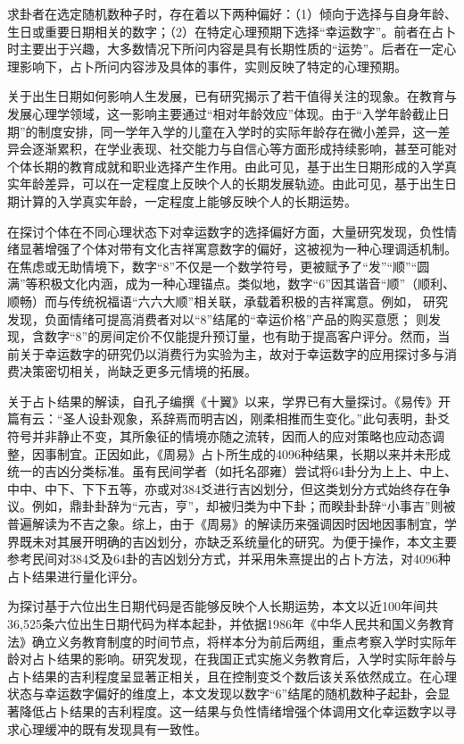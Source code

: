 \documentclass[11pt, a4paper, UTF8]{chinese-erj}
\begin{document}
求卦者在选定随机数种子时，存在着以下两种偏好：（1）倾向于选择与自身年龄、生日或重要日期相关的数字；（2）在特定心理预期下选择“幸运数字”。前者在占卜时主要出于兴趣，大多数情况下所问内容是具有长期性质的“运势”。后者在一定心理影响下，占卜所问内容涉及具体的事件，实则反映了特定的心理预期。

关于出生日期如何影响人生发展，已有研究揭示了若干值得关注的现象。在教育与发展心理学领域，这一影响主要通过“相对年龄效应”体现。由于“入学年龄截止日期”的制度安排，同一学年入学的儿童在入学时的实际年龄存在微小差异，这一差异会逐渐累积，在学业表现、社交能力与自信心等方面形成持续影响，甚至可能对个体长期的教育成就和职业选择产生作用\parencite{xu2021}。由此可见，基于出生日期形成的入学真实年龄差异，可以在一定程度上反映个人的长期发展轨迹。由此可见，基于出生日期计算的入学真实年龄，一定程度上能够反映个人的长期运势。

在探讨个体在不同心理状态下对幸运数字的选择偏好方面，大量研究发现，负性情绪显著增强了个体对带有文化吉祥寓意数字的偏好，这被视为一种心理调适机制。在焦虑或无助情境下，数字“8”不仅是一个数学符号，更被赋予了“发”“顺”“圆满”等积极文化内涵，成为一种心理锚点。类似地，数字“6”因其谐音“顺”（顺利、顺畅）而与传统祝福语“六六大顺”相关联，承载着积极的吉祥寓意。例如，\textcite{chen2022} 研究发现，负面情绪可提高消费者对以“8”结尾的“幸运价格”产品的购买意愿；\textcite{luo2022} 则发现，含数字“8”的房间定价不仅能提升预订量，也有助于提高客户评分。然而，当前关于幸运数字的研究仍以消费行为实验为主，故对于幸运数字的应用探讨多与消费决策密切相关，尚缺乏更多元情境的拓展。

关于占卜结果的解读，自孔子编撰《十翼》以来，学界已有大量探讨。《易传》开篇有云：“圣人设卦观象，系辞焉而明吉凶，刚柔相推而生变化。”此句表明，卦爻符号并非静止不变，其所象征的情境亦随之流转，因而人的应对策略也应动态调整，因事制宜。正因如此，《周易》占卜所生成的4096种结果，长期以来并未形成统一的吉凶分类标准。虽有民间学者（如托名邵雍）尝试将64卦分为上上、中上、中中、中下、下下五等，亦或对384爻进行吉凶划分，但这类划分方式始终存在争议。例如，鼎卦卦辞为“元吉，亨”，却被归类为中下卦；而睽卦卦辞“小事吉”则被普遍解读为不吉之象。综上，由于《周易》的解读历来强调因时因地因事制宜，学界既未对其展开明确的吉凶划分，亦缺乏系统量化的研究。为便于操作，本文主要参考民间对384爻及64卦的吉凶划分方式，并采用朱熹提出的占卜方法，对4096种占卜结果进行量化评分。

为探讨基于六位出生日期代码是否能够反映个人长期运势，本文以近100年间共36,525条六位出生日期代码为样本起卦，并依据1986年《中华人民共和国义务教育法》确立义务教育制度的时间节点，将样本分为前后两组，重点考察入学时实际年龄对占卜结果的影响。研究发现，在我国正式实施义务教育后，入学时实际年龄与占卜结果的吉利程度呈显著正相关，且在控制变爻个数后该关系依然成立。在心理状态与幸运数字偏好的维度上，本文发现以数字“6”结尾的随机数种子起卦，会显著降低占卜结果的吉利程度。这一结果与负性情绪增强个体调用文化幸运数字以寻求心理缓冲的既有发现具有一致性。
\end{document}
